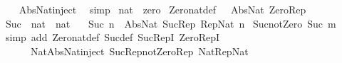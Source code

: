 \begin{isabellebody}
%
\isadelimproof
\ \ %
\endisadelimproof
%
\isatagproof
{}\isamarkupfalse%
\ Abs{\isacharunderscore}{\kern0pt}Nat{\isacharunderscore}{\kern0pt}inject\ \isamarkupfalse%
\ simp%
\endisatagproof
{\isafoldproof}%
%
\isadelimproof
\isanewline
%
\endisadelimproof
\isanewline
{}\isamarkupfalse%
\ nat\ {\isacharcolon}{\kern0pt}{\isacharcolon}{\kern0pt}\ zero\isanewline
{}\isanewline
\isanewline
{}\isamarkupfalse%
\ Zero{\isacharunderscore}{\kern0pt}nat{\isacharunderscore}{\kern0pt}def{\isacharcolon}{\kern0pt}\ {\isachardoublequoteopen}{}\ {\isacharequal}{\kern0pt}\ Abs{\isacharunderscore}{\kern0pt}Nat\ Zero{\isacharunderscore}{\kern0pt}Rep{\isachardoublequoteclose}\isanewline
\isanewline
{}\isamarkupfalse%
%
\isadelimproof
\ %
\endisadelimproof
%
\isatagproof
\isacommand{{\isachardot}{\kern0pt}{\isachardot}{\kern0pt}}\isamarkupfalse%
%
\endisatagproof
{\isafoldproof}%
%
\isadelimproof
%
\endisadelimproof
\isanewline
\isanewline
{}\isamarkupfalse%
\isanewline
\isanewline
{}\isamarkupfalse%
\ Suc\ {\isacharcolon}{\kern0pt}{\isacharcolon}{\kern0pt}\ {\isachardoublequoteopen}nat\ {\isasymRightarrow}\ nat{\isachardoublequoteclose}\isanewline
\ \ \ {\isachardoublequoteopen}Suc\ n\ {\isacharequal}{\kern0pt}\ Abs{\isacharunderscore}{\kern0pt}Nat\ {\isacharparenleft}{\kern0pt}Suc{\isacharunderscore}{\kern0pt}Rep\ {\isacharparenleft}{\kern0pt}Rep{\isacharunderscore}{\kern0pt}Nat\ n{\isacharparenright}{\kern0pt}{\isacharparenright}{\kern0pt}{\isachardoublequoteclose}\isanewline
\isanewline
{}\isamarkupfalse%
\ Suc{\isacharunderscore}{\kern0pt}not{\isacharunderscore}{\kern0pt}Zero{\isacharcolon}{\kern0pt}\ {\isachardoublequoteopen}Suc\ m\ {\isasymnoteq}\ {}{\isachardoublequoteclose}\isanewline
%
\isadelimproof
\ \ %
\endisadelimproof
%
\isatagproof
{}\isamarkupfalse%
\ {\isacharparenleft}{\kern0pt}simp\ add{\isacharcolon}{\kern0pt}\ Zero{\isacharunderscore}{\kern0pt}nat{\isacharunderscore}{\kern0pt}def\ Suc{\isacharunderscore}{\kern0pt}def\ Suc{\isacharunderscore}{\kern0pt}RepI\ Zero{\isacharunderscore}{\kern0pt}RepI\isanewline
\ \ \ \ \ \ Nat{\isacharunderscore}{\kern0pt}Abs{\isacharunderscore}{\kern0pt}Nat{\isacharunderscore}{\kern0pt}inject\ Suc{\isacharunderscore}{\kern0pt}Rep{\isacharunderscore}{\kern0pt}not{\isacharunderscore}{\kern0pt}Zero{\isacharunderscore}{\kern0pt}Rep\ Nat{\isacharunderscore}{\kern0pt}Rep{\isacharunderscore}{\kern0pt}Nat{\isacharparenright}{\kern0pt}%

\end{isabellebody}
